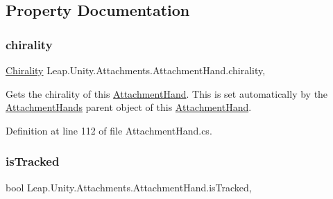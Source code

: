 \subsection{Property Documentation}
\mbox{\label{class_leap_1_1_unity_1_1_attachments_1_1_attachment_hand_af525bdb21f50e37061ce6b69a351654f}} 
\subsubsection{\texorpdfstring{chirality}{chirality}}
{\footnotesize\ttfamily \mbox{\hyperlink{namespace_leap_1_1_unity_a4d15adcf20ba121b2cd9c07f503b606f}{Chirality}} Leap.\+Unity.\+Attachments.\+Attachment\+Hand.\+chirality\hspace{0.3cm}{\ttfamily [get]}, {\ttfamily [set]}}



Gets the chirality of this \mbox{\hyperlink{class_leap_1_1_unity_1_1_attachments_1_1_attachment_hand}{Attachment\+Hand}}. This is set automatically by the \mbox{\hyperlink{class_leap_1_1_unity_1_1_attachments_1_1_attachment_hands}{Attachment\+Hands}} parent object of this \mbox{\hyperlink{class_leap_1_1_unity_1_1_attachments_1_1_attachment_hand}{Attachment\+Hand}}. 



Definition at line 112 of file Attachment\+Hand.\+cs.

\mbox{\label{class_leap_1_1_unity_1_1_attachments_1_1_attachment_hand_a30d8d19f9b563e6207b3d317ab29d6e7}} 
\subsubsection{\texorpdfstring{isTracked}{isTracked}}
{\footnotesize\ttfamily bool Leap.\+Unity.\+Attachments.\+Attachment\+Hand.\+is\+Tracked\hspace{0.3cm}{\ttfamily [get]}, {\ttfamily [set]}}



